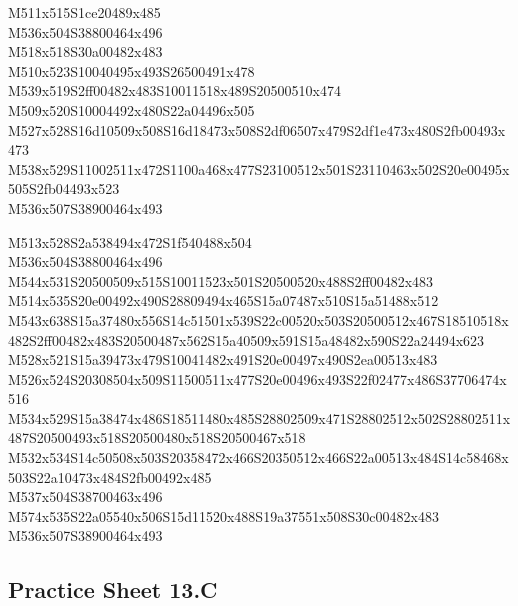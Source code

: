 \documentclass{article}
\begin{document}
\begin{multicols}{5}
\begin{center}
M511x515S1ce20489x485 %
\\M536x504S38800464x496 %
\\M518x518S30a00482x483 %
\\M510x523S10040495x493S26500491x478 %
\\M539x519S2ff00482x483S10011518x489S20500510x474 %
\\M509x520S10004492x480S22a04496x505 %
\\M527x528S16d10509x508S16d18473x508S2df06507x479S2df1e473x480S2fb00493x473 %
\\M538x529S11002511x472S1100a468x477S23100512x501S23110463x502S20e00495x505S2fb04493x523 %
\\M536x507S38900464x493 %
\vfil
\columnbreak

M513x528S2a538494x472S1f540488x504 %
\\M536x504S38800464x496 %
\\M544x531S20500509x515S10011523x501S20500520x488S2ff00482x483 %
\\M514x535S20e00492x490S28809494x465S15a07487x510S15a51488x512 %
\\M543x638S15a37480x556S14c51501x539S22c00520x503S20500512x467S18510518x482S2ff00482x483S20500487x562S15a40509x591S15a48482x590S22a24494x623 %
\\M528x521S15a39473x479S10041482x491S20e00497x490S2ea00513x483 %
\\M526x524S20308504x509S11500511x477S20e00496x493S22f02477x486S37706474x516 %
\\M534x529S15a38474x486S18511480x485S28802509x471S28802512x502S28802511x487S20500493x518S20500480x518S20500467x518 %
\\M532x534S14c50508x503S20358472x466S20350512x466S22a00513x484S14c58468x503S22a10473x484S2fb00492x485 %
\\M537x504S38700463x496 %
\\M574x535S22a05540x506S15d11520x488S19a37551x508S30c00482x483 %
\\M536x507S38900464x493 %
\vfil

\end{center}
\end{multicols}

\subsection{Practice Sheet 13.C}
\end{document}
